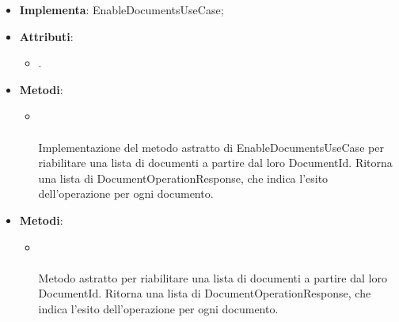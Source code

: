\documentclass[10pt, a4paper]{article}
\begin{document}
\label{EnableDocumentsServiceDettaglio}
\begin{itemize}
    \item \textbf{Implementa}: EnableDocumentsUseCase;
    \item \textbf{Attributi}:
    \begin{itemize}
        \item {}.  
    \end{itemize}
    \item \textbf{Metodi}:
    \begin{itemize}
        \item {}\\ \\
        Implementazione del metodo astratto di EnableDocumentsUseCase per riabilitare una lista di documenti a partire dal loro DocumentId. Ritorna una lista di DocumentOperationResponse, che indica l'esito dell'operazione per ogni documento.
    \end{itemize}
\end{itemize}

\label{EnableDocumentsUseCaseDettaglio}
\begin{itemize}
    \item \textbf{Metodi}:
    \begin{itemize}
        \item {}\\ \\
        Metodo astratto per riabilitare una lista di documenti a partire dal loro DocumentId. Ritorna una lista di DocumentOperationResponse, che indica l'esito dell'operazione per ogni documento.
    \end{itemize}
\end{itemize}
\end{document}
